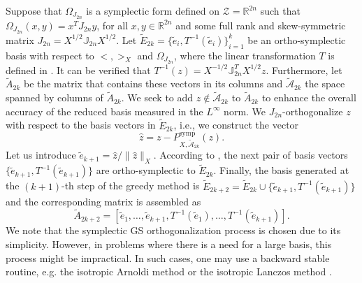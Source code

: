 Suppose that $\Omega_{J_{2n}}$ is a symplectic form defined on $\mathcal Z =\mathbb R^{2n}$ such that $\Omega_{J_{2n}}(x,y) = x^T J_{2n} y$, for all $x,y\in \mathbb R^{2n}$ and some full rank and skew-symmetric matrix $J_{2n} = X^{1/2} \mathbb J_{2n} X^{1/2}$. Let $\tilde E_{2k} = \{ \tilde e_i , T^{-1}(\tilde e_i) \}_{i=1}^k$ be an ortho-symplectic basis with respect to $<,>_X$ and $\Omega_{J_{2n}}$, where the linear transformation $T$ is defined in . It can be verified that $T^{-1}(z) = X^{-1/2}\mathbb J^T_{2n}X^{1/2}z$. Furthermore, let $\tilde A_{2k}$ be the matrix that contains these vectors in its columns and $\tilde {\mathcal A}_{2k}$ the space spanned by columns of $\tilde A_{2k}$. We seek to add $z\not \in \tilde{\mathcal A}_{2k}$ to $\tilde A_{2k}$ to enhance the overall accuracy of the reduced basis measured in the $L^{\infty}$ norm. We $J_{2n}$-orthogonalize $z$ with respect to the basis vectors in $\tilde E_{2k}$, i.e., we construct the vector 
\begin{equation} \label{eq:normmor.9}
	\hat z = z - P^{\text{symp}}_{X,\tilde{\mathcal A}_{2k}}(z).
\end{equation}
Let us introduce $\tilde e_{k+1} = \hat z / \| \hat z \|_X$. According to , the next pair of basis vectors $\{ \tilde e_{k+1} , T^{-1}( \tilde e_{k+1})\}$ are ortho-symplectic to $\tilde E_{2k}$. Finally, the basis generated at the $(k+1)$-th step of the greedy method is $\tilde E_{2k+2} = \tilde E_{2k}\cup\{ \tilde e_{k+1} , T^{-1}(\tilde e_{k+1})\}$ and the corresponding matrix is assembled as
\begin{equation} \label{eq:normmor.11}
	\tilde A_{2k+2} = [\tilde e_1,\dots,\tilde e_{k+1},T^{-1}(\tilde e_1),\dots,T^{-1}(\tilde e_{k+1})].
\end{equation}
We note that the symplectic GS orthogonalization process is chosen due to its simplicity. However, in problems where there is a need for a large basis, this process might be impractical. In such cases, one may use a backward stable routine, e.g. the isotropic Arnoldi method or the isotropic Lanczos method \cite{doi:10.1137/S1064827500366434}.

